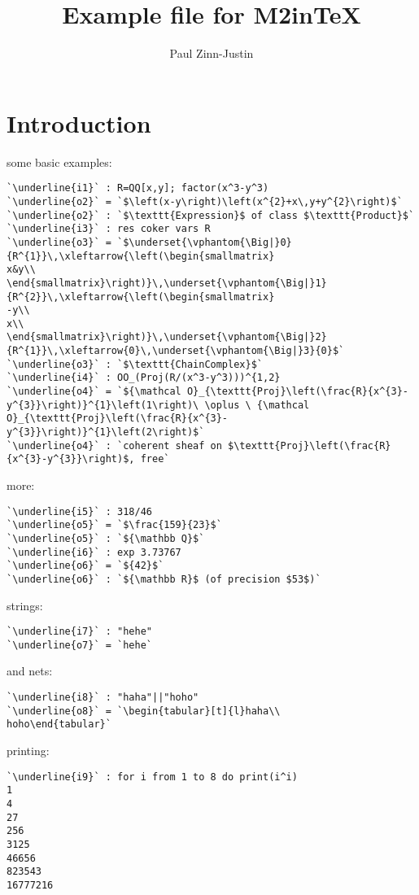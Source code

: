 \documentclass[12pt,a4paper]{amsart}
\title{Example file for M2inTeX}
\author{Paul Zinn-Justin}
\begin{document}
\maketitle

\section{Introduction}
some basic examples:
\begin{lstlisting}[language=Macaulay2]
`\underline{i1}` : R=QQ[x,y]; factor(x^3-y^3)
`\underline{o2}` = `$\left(x-y\right)\left(x^{2}+x\,y+y^{2}\right)$`
`\underline{o2}` : `$\texttt{Expression}$ of class $\texttt{Product}$`
`\underline{i3}` : res coker vars R
`\underline{o3}` = `$\underset{\vphantom{\Big|}0}{R^{1}}\,\xleftarrow{\left(\begin{smallmatrix}
x&y\\
\end{smallmatrix}\right)}\,\underset{\vphantom{\Big|}1}{R^{2}}\,\xleftarrow{\left(\begin{smallmatrix}
-y\\
x\\
\end{smallmatrix}\right)}\,\underset{\vphantom{\Big|}2}{R^{1}}\,\xleftarrow{0}\,\underset{\vphantom{\Big|}3}{0}$`
`\underline{o3}` : `$\texttt{ChainComplex}$`
`\underline{i4}` : OO_(Proj(R/(x^3-y^3)))^{1,2}
`\underline{o4}` = `${\mathcal O}_{\texttt{Proj}\left(\frac{R}{x^{3}-y^{3}}\right)}^{1}\left(1\right)\ \oplus \ {\mathcal O}_{\texttt{Proj}\left(\frac{R}{x^{3}-y^{3}}\right)}^{1}\left(2\right)$`
`\underline{o4}` : `coherent sheaf on $\texttt{Proj}\left(\frac{R}{x^{3}-y^{3}}\right)$, free`\end{lstlisting}
more:
\begin{lstlisting}[language=Macaulay2]
`\underline{i5}` : 318/46
`\underline{o5}` = `$\frac{159}{23}$`
`\underline{o5}` : `${\mathbb Q}$`
`\underline{i6}` : exp 3.73767
`\underline{o6}` = `${42}$`
`\underline{o6}` : `${\mathbb R}$ (of precision $53$)`\end{lstlisting}
strings:
\begin{lstlisting}[language=Macaulay2]
`\underline{i7}` : "hehe"
`\underline{o7}` = `hehe`\end{lstlisting}
and nets:
\begin{lstlisting}[language=Macaulay2]
`\underline{i8}` : "haha"||"hoho"
`\underline{o8}` = `\begin{tabular}[t]{l}haha\\
hoho\end{tabular}`\end{lstlisting}
printing:
\begin{lstlisting}[language=Macaulay2]
`\underline{i9}` : for i from 1 to 8 do print(i^i)
1
4
27
256
3125
46656
823543
16777216\end{lstlisting}
\end{document}
